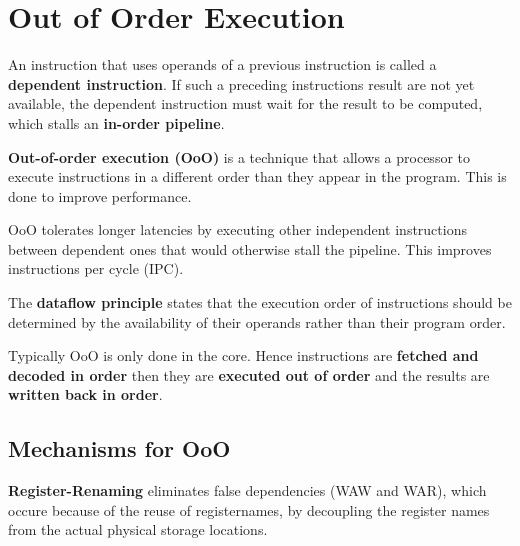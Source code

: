 \section{Out of Order Execution}

\begin{remark}
    An instruction that uses operands of a previous instruction is called a \textbf{dependent instruction}. If such a preceding instructions result are not yet available, the dependent instruction must wait for the result to be computed, which stalls an \textbf{in-order pipeline}.
\end{remark}

\begin{definition}
    \textbf{Out-of-order execution (OoO)} is a technique that allows a processor to execute instructions in a different order than they appear in the program. This is done to improve performance.
\end{definition}

\begin{remark}
    OoO tolerates longer latencies by executing other independent instructions between dependent ones that would otherwise stall the pipeline. This improves instructions per cycle (IPC).
\end{remark}

\begin{definition}
    The \textbf{dataflow principle} states that the execution order of instructions should be determined by the availability of their operands rather than their program order.
\end{definition}

\begin{remark}
    Typically OoO is only done in the core. Hence instructions are \textbf{fetched and decoded in order} then they are \textbf{executed out of order} and the results are \textbf{written back in order}.
\end{remark}

\subsection{Mechanisms for OoO}

\begin{definition}
    \textbf{Register-Renaming} eliminates false dependencies (WAW and WAR), which occure because of the reuse of registernames, by decoupling the register names from the actual physical storage locations.
\end{definition}

